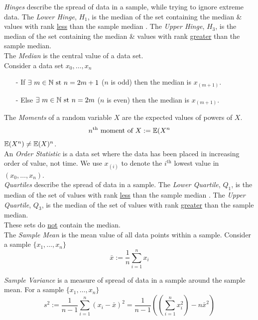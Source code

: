 \documentclass[11pt,a4paper]{article}
\begin{document}
\textit{Hinges} describe the spread of data in a sample, while trying to ignore extreme data. The \textit{Lower Hinge}, $H_1$, is the median of the set containing the median \& values with rank \underline{less} than the sample median . The \textit{Upper Hinge}, $H_3$, is the median of the set containing the median \& values with rank \underline{greater} than the sample median.\\

The \textit{Median} is the central value of a data set.\\
Consider a data set $x_0,\dots,x_n$
\begin{itemize}
	\item[-] If $\exists\ m\in\mathbb{N}\text{ st } n=2m+1$ (\ie $n$ is odd) then the median is $x_{(m+1)}$.
	\item[-] Else $\exists\ m\in\mathbb{N}\text{ st } n=2m$ (\ie $n$ is even) then the median is $x_{(m+1)}$.
\end{itemize}

The \textit{Moments} of a random variable $X$ are the expected values of powers of $X$.
$$n^{\text{th}}\text{ moment of }X:=\mathbb{E}(X^n$$
\nb $\mathbb{E}(X^n)\neq\mathbb{E}(X)^n$.\\

An \textit{Order Statistic} is a data set where the data has been placed in increasing order of value, not time. We use $x_{(i)}$ to denote the $i^\text{th}$ lowest value in $(x_0,\dots,x_n)$.\\

\textit{Quartiles} describe the spread of data in a sample.  The \textit{Lower Quartile}, $Q_1$, is the median of the set of values with rank \underline{less} than the sample median . The \textit{Upper Quartile}, $Q_3$, is the median of the set of values with rank \underline{greater} than the sample median.\\
\nb These sets do \underline{not} contain the median.\\

The \textit{Sample Mean} is the mean value of all data points within a sample. Consider a sample $\{x_1,\dots,x_n\}$
$$\bar{x}:=\frac{1}{n}\sum_{i=1}^nx_i$$

\textit{Sample Variance} is a measure of spread of data in a sample around the sample mean. For a sample $\{x_1,\dots,x_n\}$
$$s^2:=\frac{1}{n-1}\sum_{i=1}^n(x_i-\bar{x})^2=\frac{1}{n-1}\left(\left(\sum_{i=1}^nx_i^2\right)-n\bar{x}^2\right)$$
\end{document}
